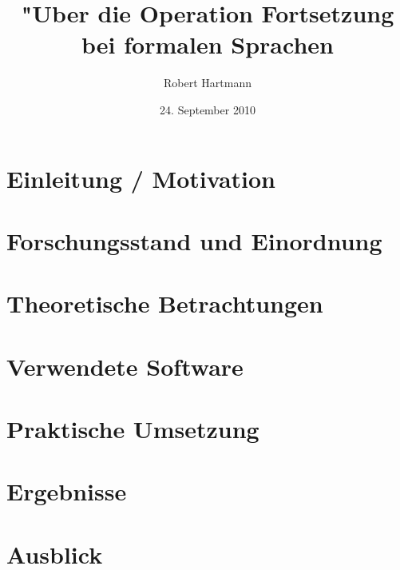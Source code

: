 \documentclass[12pt]{scrreprt}
\author{Robert Hartmann}
\title{"Uber die Operation Fortsetzung bei formalen Sprachen}
\date{24. September 2010}
\theoremstyle{remark}
\begin{document}

%

\pagestyle{plain}
\tableofcontents

\onehalfspacing

\chapter{Einleitung / Motivation}


\chapter{Forschungsstand und Einordnung}


\chapter{Theoretische Betrachtungen}


\chapter{Verwendete Software}


\chapter{Praktische Umsetzung}


\chapter{Ergebnisse}


\chapter{Ausblick}





\end{document}
